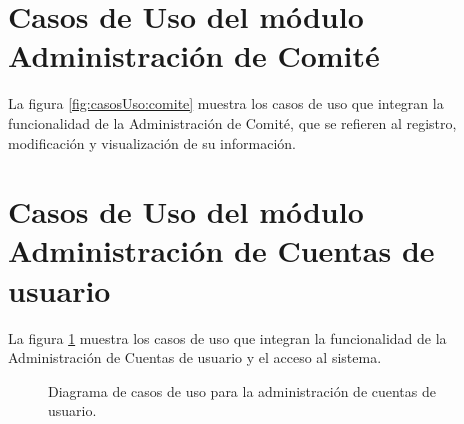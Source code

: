 \section{Casos de Uso del módulo Administración de Comité}
La figura \ref{fig:casosUso:comite} muestra los casos de uso que integran la funcionalidad de la Administración de Comité, que se refieren al registro, modificación y visualización de su información.


\section{Casos de Uso del módulo Administración de Cuentas de usuario}
La figura \ref{fig:casosUso:cuentasUsuario} muestra los casos de uso que integran la funcionalidad de la Administración de Cuentas de usuario y el acceso al sistema. 

\begin{figure}[h!]
    \begin{center}
    \caption{Diagrama de casos de uso para la administración de cuentas de usuario.}
    \label{fig:casosUso:cuentasUsuario}
    \end{center}
\end{figure}
